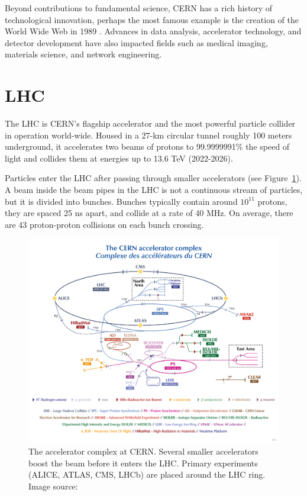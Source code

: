 Beyond contributions to fundamental science, \ac{CERN} has a rich history of technological innovation, perhaps the most famous example is the creation of the World Wide Web in 1989 \cite{www-proposal}. Advances in data analysis, accelerator technology, and detector development have also impacted fields such as medical imaging, materials science, and network engineering.

\clearpage
\section{\acs{LHC}}
\label{sec:lhc-experiments}

The \ac{LHC} \cite{Lebrun:1284331, Brüning:782076} is \ac{CERN}'s flagship accelerator and the most powerful particle collider in operation world-wide. Housed in a 27-km circular tunnel roughly 100 meters underground, it accelerates two beams of protons to 99.9999991\% the speed of light and collides them at energies up to 13.6 \ac{TeV} (2022-2026).

Particles enter the \ac{LHC} after passing through smaller accelerators (see Figure~\ref{fig:cern-complex}). A beam inside the beam pipes in the \ac{LHC} is not a continuous stream of particles, but it is divided into bunches. Bunches typically contain around $10^{11}$ protons, they are spaced 25 ns apart, and collide at a rate of 40 MHz. On average, there are 43 proton-proton collisions on each bunch crossing.

\begin{figure}[htbp]
\centering
\includegraphics[width=\textwidth]{images/introduction/cern-experiments.png}
\caption[The accelerator complex at CERN]{The accelerator complex at \acs{CERN}. Several smaller accelerators boost the beam before it enters the \acs{LHC}. Primary experiments (\acs{ALICE}, \acs{ATLAS}, \acs{CMS}, \acs{LHCb}) are placed around the \acs{LHC} ring. Image source: \protect\cite{cern_accelerator_complex}}
\label{fig:cern-complex}
\end{figure}

